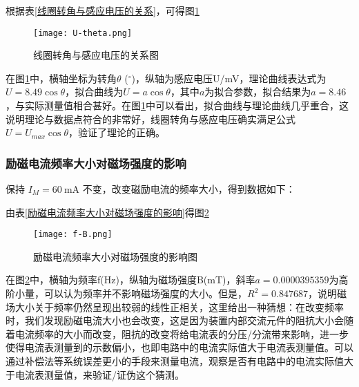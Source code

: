 \documentclass[11pt]{article}
\begin{document}
	根据表\ref{线圈转角与感应电压的关系}，可得图\ref{fig:U-theta}
	\begin{figure}[H]
		\centering
		\texttt{[image: U-theta.png]}
		\caption{线圈转角与感应电压的关系图}
		\label{fig:U-theta}
	\end{figure}
	在图\ref{fig:U-theta}中，横轴坐标为转角$\theta$ ($^\circ$)，纵轴为感应电压U/mV，理论曲线表达式为$U=8.49 \cos \theta$，拟合曲线为$U=a \cos \theta$，其中$a$为拟合参数，拟合结果为$a=8.46$，与实际测量值相合甚好。在图\ref{fig:U-theta}中可以看出，拟合曲线与理论曲线几乎重合，这说明理论与数据点符合的非常好，线圈转角与感应电压确实满足公式$U=U_{max} \cos \theta$，验证了理论的正确。
	
	
	\subsubsection{励磁电流频率大小对磁场强度的影响}
	保持 $I_M = 60 \ \mathrm{mA}$ 不变，改变磁励电流的频率大小，得到数据如下：
	\begin{table}[H]\centering
		\caption{励磁电流频率大小对磁场强度的影响}
		\label{励磁电流频率大小对磁场强度的影响}
	\end{table}
	
	由表\ref{励磁电流频率大小对磁场强度的影响}得图\ref{fig:B-f}
	\begin{figure}[H]
		\centering
		\texttt{[image: f-B.png]}
		\caption{励磁电流频率大小对磁场强度的影响图}
		\label{fig:B-f}
	\end{figure}
	
	在图\ref{fig:B-f}中，横轴为频率f(Hz)，纵轴为磁场强度B(mT)，斜率$a=0.0000395359$为高阶小量，可以认为频率并不影响磁场强度的大小。但是，$R^2=0.847687$，说明磁场大小关于频率仍然呈现出较弱的线性正相关，这里给出一种猜想：在改变频率时，我们发现励磁电流大小也会改变，这是因为装置内部交流元件的阻抗大小会随着电流频率的大小而改变，阻抗的改变将给电流表的分压/分流带来影响，进一步使得电流表测量到的示数偏小，也即电路中的电流实际值大于电流表测量值。可以通过补偿法等系统误差更小的手段来测量电流，观察是否有电路中的电流实际值大于电流表测量值，来验证/证伪这个猜测。
	
\end{document}
